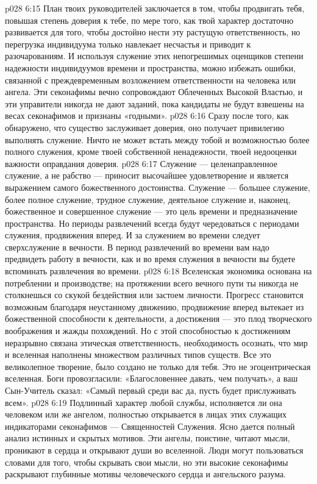 \vs p028 6:15 \pc План твоих руководителей заключается в том, чтобы продвигать тебя, повышая степень доверия к тебе, по мере того, как твой характер достаточно развивается для того, чтобы достойно нести эту растущую ответственность, но перегрузка индивидуума только навлекает несчастья и приводит к разочарованиям. И используя служение этих непогрешимых оценщиков степени надежности индивидуумов времени и пространства, можно избежать ошибки, связанной с преждевременным возложением ответственности на человека или ангела. Эти секонафимы вечно сопровождают Облеченных Высокой Властью, и эти управители никогда не дают заданий, пока кандидаты не будут взвешены на весах секонафимов и признаны «годными».
\vs p028 6:16 \bibnobreakspace {} Сразу после того, как обнаружено, что существо заслуживает доверия, оно получает привилегию выполнять служение. Ничто не может встать между тобой и возможностью более полного служения, кроме твоей собственной ненадежности, твоей недооценки важности оправдания доверия.
\vs p028 6:17 Служение --- целенаправленное служение, а не рабство --- приносит высочайшее удовлетворение и является выражением самого божественного достоинства. Служение --- большее служение, более полное служение, трудное служение, деятельное служение и, наконец, божественное и совершенное служение --- это цель времени и предназначение пространства. Но периоды развлечений всегда будут чередоваться с периодами служения, продвижения вперед. И за служением во времени следует сверхслужение в вечности. В период развлечений во времени вам надо предвидеть работу в вечности, как и во время служения в вечности вы будете вспоминать развлечения во времени.
\vs p028 6:18 \pc Вселенская экономика основана на потреблении и производстве; на протяжении всего вечного пути ты никогда не столкнешься со скукой бездействия или застоем личности. Прогресс становится возможным благодаря неустанному движению, продвижение вперед вытекает из божественной способности к деятельности, а достижения --- это плод творческого воображения и жажды похождений. Но с этой способностью к достижениям неразрывно связана этическая ответственность, необходимость осознать, что мир и вселенная наполнены множеством различных типов существ. Все это великолепное творение,  было создано не только для тебя. Это не эгоцентрическая вселенная. Боги провозгласили: «Благословеннее давать, чем получать», а ваш Сын\hyp{}Учитель сказал: «Самый первый среди вас да, пусть будет прислуживать всем».
\vs p028 6:19 \pc Подлинный характер любой службы, исполняется ли она человеком или же ангелом, полностью открывается в лицах этих служащих индикаторами секонафимов --- Священностей Служения. Ясно дается полный анализ истинных и скрытых мотивов. Эти ангелы, поистине, читают мысли, проникают в сердца и открывают души во вселенной. Люди могут пользоваться словами для того, чтобы скрывать свои мысли, но эти высокие секонафимы раскрывают глубинные мотивы человеческого сердца и ангельского разума.
